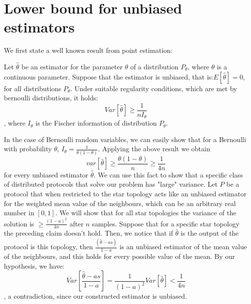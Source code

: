 \section{Lower bound for unbiased estimators}

We first state a well known result from point estimation:
\begin{lemma}Let $\hat{\theta}$ be an estimator for the parameter $\theta$ of a distribution $P_\theta$, where $\theta$ is a continuous parameter. Suppose that the estimator is unbiased, that is:$E[\hat{\theta}] = 0$, for all distributions $P_\theta$. Under suitable regularity conditions, which are met by bernoulli distributions, it holds:$$Var[\hat{\theta}] \geq  \frac{1}{nI_\theta}$$, where $I_\theta$ is the Fischer information of distribution $P_\theta$.
\end{lemma}

In the case of Bernoulli random variables, we can easily show that for a Bernoulli with probability $\theta$, $I_\theta = \frac{1}{\theta(1-\theta)} $. Applying the above result we obtain $$ var[\hat{\theta}] \geq \frac{\theta(1-\theta) }{n}\geq \frac{1}{4n} $$ for every unbiased estimator $\hat{\theta}$. We can use this fact to show that a specific class of distributed protocols that solve our problem has "large" variance. Let $P$ be a protocol that when restricted to the star topology acts like an unbiased estimator for the weighted mean value of the neighbours, which can be an arbitrary real number in $[0,1]$. We will show that for all star topologies the variance of the solution is $\geq \frac{(1-a)^2}{4n}$ after $n$ samples. Suppose that for a specific star topology the preceding claim doesn't hold. Then, we notice that if $\hat{\theta}$ is the output of the protocol is this topology, then $\frac{(\hat{\theta}-as)}{1-a}$ is an unbiased estimator of the mean value of the neighbours, and this holds for every possible value of the mean. By our hypothesis, we have:
$$Var[\frac{\hat{\theta}-as}{1-a}] = \frac{1}{(1-a)^2}Var[\hat{\theta}] < \frac{1}{4n}$$, a contradiction, since our constructed estimator is unbiased. 
